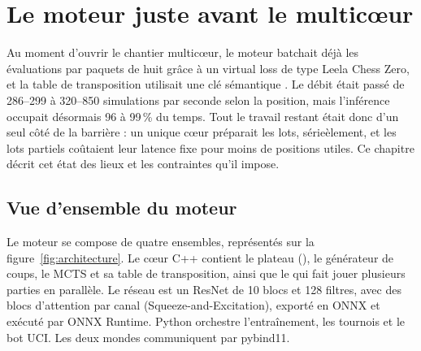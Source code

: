 \section{Le moteur juste avant le multic\oe{}ur}
\label{sec:contexte}

\begin{resume}
Au moment d'ouvrir le chantier multic\oe{}ur, le moteur batchait d\'ej\`a les
\'evaluations par paquets de huit gr\^ace \`a un virtual loss de type Leela
Chess Zero, et la table de transposition utilisait une cl\'e s\'emantique
. Le d\'ebit \'etait pass\'e de 286--299 \`a 320--850 simulations par
seconde selon la position, mais l'inf\'erence occupait d\'esormais 96 \`a
99\,\% du temps. Tout le travail restant \'etait donc d'un seul c\^ot\'e de la
barri\`ere : un unique c\oe{}ur pr\'eparait les lots, s\'erie\`element, et les
lots partiels co\^utaient leur latence fixe pour moins de positions utiles.
Ce chapitre d\'ecrit cet \'etat des lieux et les contraintes qu'il impose.
\end{resume}

\subsection{Vue d'ensemble du moteur}

Le moteur se compose de quatre ensembles, repr\'esent\'es sur la
figure~\ref{fig:architecture}. Le c\oe{}ur C++ contient le plateau
(), le g\'en\'erateur de coups, le MCTS et sa table de
transposition, ainsi que le  qui fait jouer plusieurs
parties en parall\`ele. Le r\'eseau est un ResNet de 10 blocs et 128 filtres,
avec des blocs d'attention par canal (Squeeze-and-Excitation), export\'e en
ONNX et ex\'ecut\'e par ONNX Runtime. Python orchestre l'entra\^inement, les
tournois et le bot UCI. Les deux mondes communiquent par pybind11.

